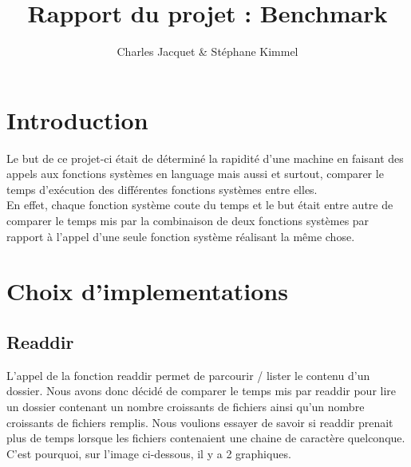 \documentclass[11pt, oneside]{article}
\title{Rapport du projet : Benchmark}
\author{Charles Jacquet & Stéphane Kimmel}
\begin{document}
\maketitle
\begin{multicols}{2}

\section{Introduction}
Le but de ce projet-ci était de déterminé la rapidité d'une machine en faisant des appels aux fonctions systèmes en language mais aussi et surtout, comparer le temps d'exécution des différentes fonctions systèmes entre elles.  \\
En effet, chaque fonction système coute du temps et le but était entre autre de comparer le temps mis par la combinaison de deux fonctions systèmes par rapport à l'appel d'une seule fonction système réalisant la même chose.

\section{Choix d'implementations}
\subsection{Readdir}
L'appel de la fonction readdir permet de parcourir / lister le contenu d'un dossier. Nous avons donc décidé de comparer le temps mis par readdir pour lire un dossier contenant un nombre croissants de fichiers ainsi qu'un nombre croissants de fichiers remplis. Nous voulions essayer de savoir si readdir prenait plus de temps lorsque les fichiers contenaient une chaine de caractère quelconque. C'est pourquoi, sur l'image ci-dessous, il y a 2 graphiques. \\


\end{multicols}
\end{document}
